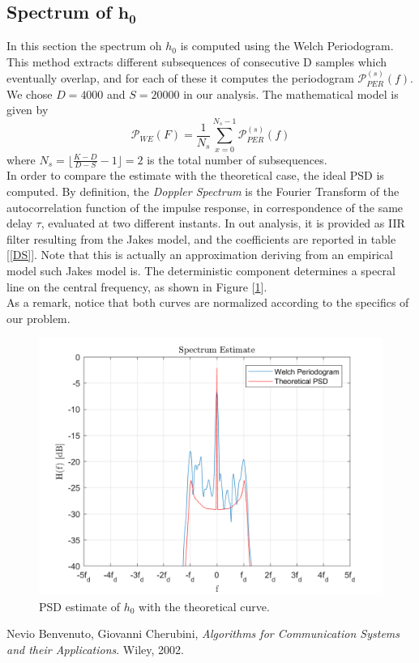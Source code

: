 \documentclass[a4paper, 12pt]{report}
\begin{document}
\clearpage
\subsection*{Spectrum of $\mathbf{h_0}$}
In this section the spectrum oh $h_0$ is computed using the Welch Periodogram. This method extracts different subsequences of consecutive D samples which eventually overlap, and for each of these it computes the periodogram $\mathcal{P}_{PER}^{\left(s\right)}(f)$. We chose $D=4000$ and $S=20000$ in our analysis. The mathematical model is given by
\begin{equation*}
\mathcal{P}_{WE}(F) = \frac{1}{N_s}\sum_{x=0}^{N_s-1}\mathcal{P}_{PER}^{(s)}(f)
\end{equation*}
where $N_s = \lfloor \frac{K-D}{D-S}-1 \rfloor = 2$ is the total number of subsequences. \\
In order to compare the estimate with the theoretical case, the ideal PSD is computed. By definition, the \textit{Doppler Spectrum} is the Fourier Transform of the autocorrelation function of the impulse response, in correspondence of the same delay $\tau$, evaluated at two different instants. In out analysis, it is provided as IIR filter resulting from the Jakes model, and the coefficients are reported in table [\ref{DS}]. Note that this is actually an approximation deriving from an empirical model such Jakes model is. The deterministic component determines a specral line on the central frequency, as shown in Figure [\ref{Welch}].\\
As a remark, notice that both curves are normalized according to the specifics of our problem.


\begin{figure}[H]
	\centering
	\includegraphics[width=14cm]{images/Welch}
	\caption{PSD estimate of $h_0$ with the theoretical curve.}\label{Welch}
\end{figure}




\begin{thebibliography}{15}
	Nevio Benvenuto, Giovanni Cherubini,
	\textit{Algorithms for Communication Systems and their Applications}. 
	Wiley, 2002.
\end{thebibliography}
\end{document}

